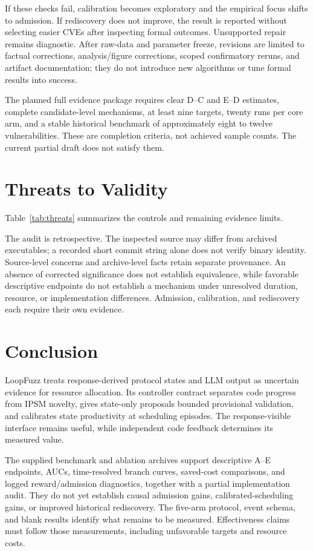 \documentclass[final,5p,times,number]{elsarticle}
\begin{document}
If these checks fail, calibration becomes exploratory and the empirical focus shifts to admission. If rediscovery does not improve, the result is reported without selecting easier CVEs after inspecting formal outcomes. Unsupported repair remains diagnostic. After raw-data and parameter freeze, revisions are limited to factual corrections, analysis/figure corrections, scoped confirmatory reruns, and artifact documentation; they do not introduce new algorithms or tune formal results into success.

The planned full evidence package requires clear D--C and E--D estimates, complete candidate-level mechanisms, at least nine targets, twenty runs per core arm, and a stable historical benchmark of approximately eight to twelve vulnerabilities. These are completion criteria, not achieved sample counts. The current partial draft does not satisfy them.

\section{Threats to Validity}
Table~\ref{tab:threats} summarizes the controls and remaining evidence limits.
\label{sec:threats}


The audit is retrospective. The inspected source may differ from archived executables; a recorded short commit string alone does not verify binary identity. Source-level concerns and archive-level facts retain separate provenance. An absence of corrected significance does not establish equivalence, while favorable descriptive endpoints do not establish a mechanism under unresolved duration, resource, or implementation differences. Admission, calibration, and rediscovery each require their own evidence.

\section{Conclusion}
LoopFuzz treats response-derived protocol states and LLM output as uncertain evidence for resource allocation. Its controller contract separates code progress from IPSM novelty, gives state-only proposals bounded provisional validation, and calibrates state productivity at scheduling episodes. The response-visible interface remains useful, while independent code feedback determines its measured value.

The supplied benchmark and ablation archives support descriptive A--E endpoints, AUCs, time-resolved branch curves, saved-cost comparisons, and logged reward/admission diagnostics, together with a partial implementation audit. They do not yet establish causal admission gains, calibrated-scheduling gains, or improved historical rediscovery. The five-arm protocol, event schema, and blank results identify what remains to be measured. Effectiveness claims must follow those measurements, including unfavorable targets and resource costs.
\end{document}
